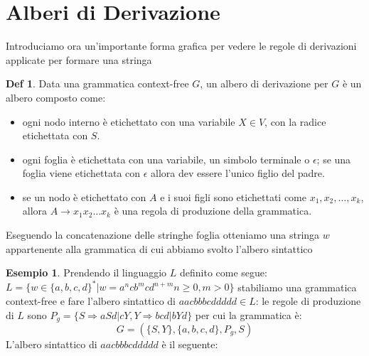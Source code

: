 \documentclass[a4paper]{book}
\theoremstyle{definition}%
\newtheorem*{defi}{Def}%
\newtheorem*{esempio}{Esempio}
\begin{document}
\section{Alberi di Derivazione}
Introduciamo ora un'importante forma grafica per vedere le regole di derivazioni applicate per formare una stringa
\begin{defi}
    Data una grammatica context-free $G$, un albero di derivazione per $G$ è un albero composto come:
    \begin{itemize}
       \item ogni nodo interno è etichettato con una variabile $X \in V$, con la radice etichettata con $S$.
       \item ogni foglia è etichettata con una variabile, un simbolo terminale o $\epsilon$; se una foglia viene etichettata
             con $\epsilon$ allora dev essere l'unico figlio del padre.
       \item se un nodo è etichettato con $A$ e i suoi figli sono etichettati come $x_1, x_2, \dots, x_k$, allora $A \to x_1x_2 \dots x_k$
             è una regola di produzione della grammatica.
    \end{itemize}
  \end{defi}
Eseguendo la concatenazione delle stringhe foglia otteniamo una stringa $w$ appartenente alla grammatica di cui abbiamo svolto l'albero sintattico
  \begin{esempio}
    Prendendo il linguaggio $L$ definito come segue:$L = \{w \in \{a,b,c,d\}^* | w = a^ncb^mcd^{n+m} n \geq 0,m > 0\}$
    stabiliamo una grammatica context-free e fare l'albero sintattico di $aacbbbcddddd \in L$:
    le regole di produzione di $L$ sono $P_g = \{S \Rightarrow aSd | cY, Y \Rightarrow bcd | bYd\}$ per cui la grammatica è:
    \begin{equation*}
      G = (\{S,Y\},\{a,b,c,d\},P_g,S)
    \end{equation*}
    L'albero sintattico di $aacbbbcddddd$ è il seguente:

  \end{esempio}
\end{document}
